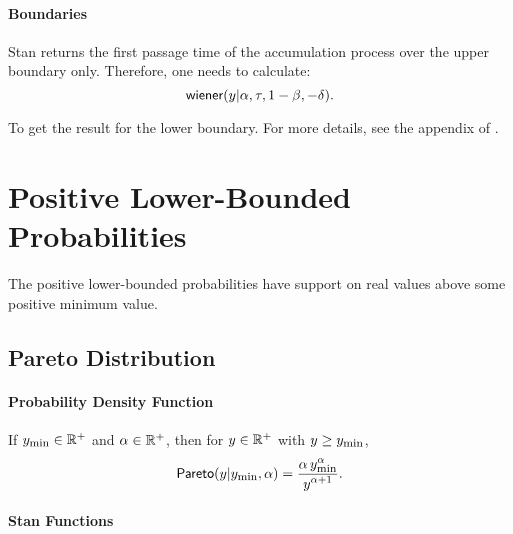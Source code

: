 \subsubsection{Boundaries}

Stan returns the first passage time of the accumulation process
over the upper boundary only. Therefore, one needs to calculate:
\[
\distro{wiener}(y|\alpha, \tau, 1 - \beta, - \delta).
\]

To get the result for the lower
boundary. For more details, see the appendix of
\citet{Vandekerckhove-Wabersich:2014}.

\chapter{Positive Lower-Bounded Probabilities}

\noindent
The positive lower-bounded probabilities have support on real values
above some positive minimum value.


\section{Pareto Distribution}

\subsubsection{Probability Density Function}

If $y_{\mbox{\footnotesize\rm min}} \in \posreals$ and $\alpha \in \posreals$, then for
$y \in \posreals$ with $y \geq y_{\mbox{\footnotesize\rm min}}$,
\[
\distro{Pareto}(y|y_{\mbox{\footnotesize\rm min}},\alpha)
=
\frac{\displaystyle \alpha\,y_{\mbox{\footnotesize\rm min}}^\alpha}{\displaystyle y^{\alpha+1}}.
\]


\subsubsection{Stan Functions}

